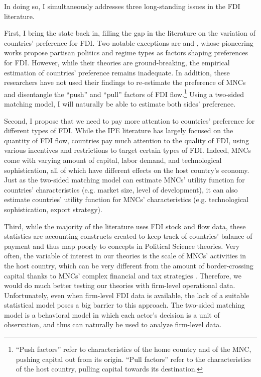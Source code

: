 In doing so, I simultaneously addresses three long-standing issues in the FDI
literature.

First, I bring the state back in, filling the gap in the literature on the
variation of countries' preference for FDI. Two notable exceptions are
\citet{Pinto2013} and \citet{Pandya2016}, whose pioneering works propose
partisan politics and regime types as factors shaping preferences for FDI.
However, while their theories are ground-breaking, the empirical estimation of
countries' preference remains inadequate. In addition, these researchers have
not used their findings to re-estimate the preference of MNCs and disentangle
the ``push'' and ``pull'' factors of FDI flow.\footnote{``Push factors'' refer
  to characteristics of the home country and of the MNC, pushing capital out
  from its origin. ``Pull factors'' refer to the characteristics of the host
  country, pulling capital towards its destination.} Using a two-sided matching
model, I will naturally be able to estimate both sides' preference.

Second, I propose that we need to pay more attention to countries' preference
for different types of FDI. While the IPE literature has largely focused on the
quantity of FDI flow, countries pay much attention to the quality of FDI, using
various incentives and restrictions to target certain types of FDI. Indeed, MNCs
come with varying amount of capital, labor demand, and technological
sophistication, all of which have different effects on the host country's
economy. Just as the two-sided matching model can estimate MNCs' utility
function for countries' characteristics (e.g. market size, level of
development), it can also estimate countries' utility function for MNCs'
characteristics (e.g. technological sophistication, export strategy).

Third, while the majority of the literature uses FDI stock and flow data, these
statistics are accounting constructs created to keep track of countries' balance
of payment and thus map poorly to concepts in Political Science theories. Very
often, the variable of interest in our theories is the scale of MNCs' activities
in the host country, which can be very different from the amount of
border-crossing capital thanks to MNCs' complex financial and tax strategies
\citep{Kerner2014}. Therefore, we would do much better testing our theories with
firm-level operational data. Unfortunately, even when firm-level FDI data is
available, the lack of a suitable statistical model poses a big barrier to this
approach. The two-sided matching model is a behavioral model in which each
actor's decision is a unit of observation, and thus can naturally be used to
analyze firm-level data.

